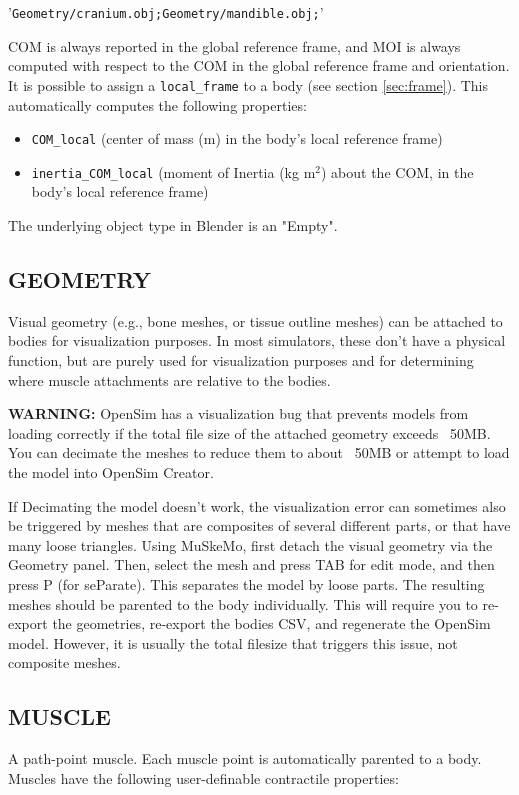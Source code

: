 \documentclass{article}
\begin{document}
'\texttt{Geometry/cranium.obj;Geometry/mandible.obj;}'

COM is always reported in the global reference frame, and MOI is always computed with respect to the COM in the global reference frame and orientation. It is possible to assign a \texttt{local\_frame} to a body (see section \ref{sec:frame}). This automatically computes the following properties:


\begin{itemize}
    \item \texttt{COM\_local} (center of mass (m) in the body's local reference frame)
    \item \texttt{inertia\_COM\_local} (moment of Inertia (kg m\(^2\)) about the COM, in the body's local reference frame)
\end{itemize}

The underlying object type in Blender is an "Empty".

\subsection{GEOMETRY}
\label{sec:geometry}

Visual geometry (e.g., bone meshes, or tissue outline meshes) can be attached to bodies for visualization purposes. In most simulators, these don't have a physical function, but are purely used for visualization purposes and for determining where muscle attachments are relative to the bodies. 

\textbf{WARNING:} OpenSim has a visualization bug that prevents models from loading correctly if the total file size of the attached geometry exceeds ~50MB. You can decimate the meshes to reduce them to about ~50MB or attempt to load the model into OpenSim Creator.

If Decimating the model doesn't work, the visualization error can sometimes also be triggered by meshes that are composites of several different parts, or that have many loose triangles. Using MuSkeMo, first detach the visual geometry via the Geometry panel. Then, select the mesh and press TAB for edit mode, and then press P (for seParate). This separates the model by loose parts. The resulting meshes should be  parented to the body individually. 
This will require you to re-export the geometries, re-export the bodies CSV, and regenerate the OpenSim model. However, it is usually the total filesize that triggers this issue, not composite meshes.

\subsection{MUSCLE}
\label{sec:muscle}
A path-point muscle. Each muscle point is automatically parented to a body. Muscles have the following user-definable contractile properties:
\end{document}
